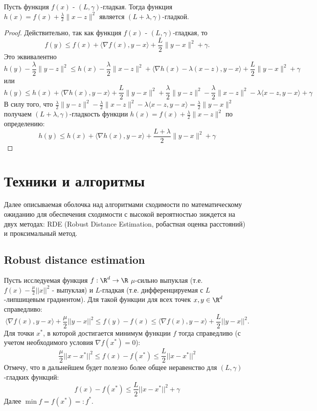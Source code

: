 \begin{lemma} \label{lemma:regular_smooth}
    Пусть функция $f(x)$ - $(L, \gamma)$-гладкая. Тогда функция $h(x) = f(x) + \frac{\lambda}{2} \|x - z\|^2$ является $(L + \lambda, \gamma)$-гладкой.
\end{lemma}
\begin{proof}
    Действительно, так как функция $f(x)$ - $(L, \gamma)$-гладкая, то
    \[f(y) \leq f(x) + \langle \nabla f(x), y - x \rangle + \frac{L}{2}\|y - x\|^2 + \gamma.\] 
    Это эквивалентно
    \[h(y) - \frac{\lambda}{2} \|y - z\|^2 \leq h(x) - \frac{\lambda}{2} \|x - z\|^2 + \langle \nabla h(x) - \lambda (x - z), y - x \rangle + \frac{L}{2}\|y - x\|^2 + \gamma\] или
    \[h(y) \leq h(x) + \langle \nabla h(x), y - x \rangle + \frac{L}{2}\|y - x\|^2 + \frac{\lambda}{2} \|y - z\|^2 - \frac{\lambda}{2} \|x - z\|^2  - \lambda \langle x - z, y - x \rangle+ \gamma\]
    В силу того, что $\frac{\lambda}{2} \|y - z\|^2 - \frac{\lambda}{2} \|x - z\|^2  - \lambda \langle x - z, y - x \rangle = \frac{\lambda}{2} \|y - x\|^2$
    получаем $(L + \lambda, \gamma)$-гладкость функции $h(x) = f(x) + \frac{\lambda}{2} \|x - z\|^2$ по определению:
    \[h(y) \leq h(x) + \langle \nabla h(x), y - x \rangle + \frac{L + \lambda}{2}\|y - x\|^2 + \gamma\]
    
    
\end{proof}

\section{Техники и алгоритмы}

Далее описываемая оболочка над алгоритмами сходимости по математическому ожиданию для обеспечения сходимости с высокой вероятностью зиждется на двух методах: RDE (Robust Distance Estimation, робастная оценка расстояний) и проксимальный метод.

\subsection{Robust distance estimation}

Пусть исследуемая функция $f:\R^d \to \R$ $\mu$-сильно выпуклая (т.е. $f(x)-\frac{\mu}{2}||x||^2$ - выпуклая) и $L$-гладкая (т.е. дифференцируемая с $L$-липшицевым градиентом). Для такой функции для всех точек $x, y \in \R^d$ справедливо:
\[\langle \nabla f(x), y - x \rangle + \frac{\mu}{2} ||y - x||^2 \le f(y) - f(x) \le \langle \nabla f(x), y - x\rangle + \frac{L}{2} ||y - x||^2.\]
Для точки $x^*$, в которой достигается минимум функции $f$ тогда справедливо (с учетом необходимого условия $\nabla f(x^*) = 0$):
\[\frac{\mu}{2} ||x- x^*||^2 \le f(x) - f(x^*) \le \frac{L}{2} ||x - x^*||^2\]
Отмечу, что в дальнейшем будет полезно более общее неравенство для $(L, \gamma)$-гладких функций:
\begin{equation} \label{approx_smooth}
    f(x) - f(x^*) \le \frac{L}{2} ||x - x^*||^2 + \gamma
\end{equation}
Далее $\min f = f(x^*) =: f^*$.

